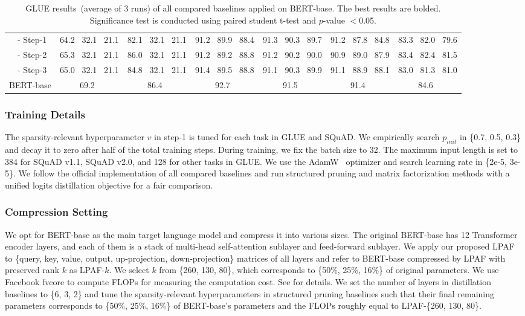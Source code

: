 \begin{table*}[t]
\begin{tabular}{l|cccccc}
		~~- Step-1   &64.2~ 32.1~ 21.1 &82.1~ 32.1~ 21.1    &91.2~ 89.9 ~88.4 &91.3~ 90.3~ 89.7 &91.2~ 87.8~ 84.8 &83.3~ 82.0~ 79.6  \\
		~~- Step-2  &65.3~ 32.1~ 21.1 &86.0~ 32.1~ 21.1    &91.2~ 89.2~ 88.8 &91.2~ 90.2~ 90.0 &90.9~ 89.0~ 87.9 &83.4~ 82.4~ 81.5 \\
		~~- Step-3   &65.0~ 32.1~ 21.1 &84.8~ 32.1~ 21.1    &91.4~ 89.5~ 88.8 &91.1~ 90.3~ 89.9 &91.1~ 88.9~ 88.1 &83.0~ 81.3~ 81.0 \\
\midrule
		BERT-base  &~~69.2~~~ &~~86.4~~~  &~~92.7~~~           & ~~91.5~~~          & ~~91.4~~~         &~~84.6~~~         \\
				\bottomrule

	\end{tabular}
	\caption{GLUE results~(average of 3 runs) of all compared baselines applied on BERT-base. The best results are bolded. Significance test is conducted using paired student t-test and $p$-value $<$0.05.}
	\label{table:all}
\end{table*}



\subsubsection{Training Details}
The sparsity-relevant hyperparameter $v$ in step-1 is tuned for each task in GLUE and SQuAD. We empirically search $p_{init}$ in \{0.7, 0.5, 0.3\} and decay it to zero after half of the total training steps. During training, we
fix the batch size to 32. The maximum input length is set to 384 for SQuAD v1.1, SQuAD v2.0, and 128 for other tasks in GLUE. We use the AdamW~\cite{adamw} optimizer and search learning rate in \{2e-5, 3e-5\}. We follow the official implementation of all compared baselines and run structured pruning and matrix factorization methods with a unified logits distillation objective for a fair comparison.


\subsubsection{Compression Setting}

We opt for BERT-base as the main target language model and compress it into various sizes. The original BERT-base has 12 Transformer encoder layers, and each of them is a stack of multi-head self-attention sublayer and feed-forward sublayer.
We apply our proposed LPAF to \{query, key, value, output, up-projection, down-projection\} matrices of all layers and refer to BERT-base compressed by  LPAF with preserved rank $k$ as LPAF-$k$. We select $k$ from \{260, 130, 80\}, which corresponds to \{50\%, 25\%, 16\%\} of original parameters. We use  Facebook fvcore to compute FLOPs for measuring the computation cost. See  for details. We set the number of layers in distillation baselines to \{6, 3, 2\} and tune the sparsity-relevant hyperparameters in structured pruning baselines such that  their final remaining parameters corresponds to \{50\%, 25\%, 16\%\} of BERT-base's parameters and the FLOPs roughly equal to LPAF-\{260, 130, 80\}.

